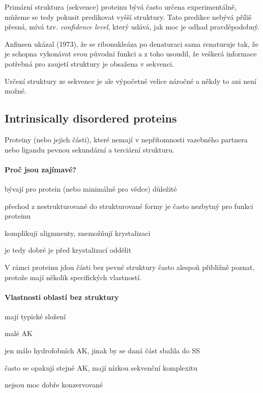 \documentclass[DIV=8]{scrreprt}
\begin{document}
Primární struktura (sekvence) proteinu bývá často určena experimentálně, můžeme se tedy pokusit predikovat vyšší struktury. Tato predikce nebývá příliš přesná, mívá tzv. \emph{confidence level}, který udává, jak moc je odhad pravděpodobný.

Anfinsen ukázal (1973), že se ribonukleáza po denaturaci sama renaturuje tak, že je schopna vykonávat svou původní funkci a z toho usoudil, že veškerá informace potřebná pro zaujetí struktury je obsažena v sekvenci.

Určení struktury ze sekvence je ale výpočetně velice náročné a někdy to ani není možné.

\subsection{Intrinsically disordered proteins} \label{Intrinsically disordered proteins}


Proteiny (nebo jejich části), které nemají v nepřítomnosti vazebného partnera nebo ligandu pevnou sekundární a terciární strukturu.

\paragraph{Proč jsou zajímavé?}
\begin{myItemize}[nosep]
    \item bývají pro protein (nebo minimálně pro vědce) důležité
    \item přechod z nestrukturované do strukturované formy je často nezbytný pro funkci proteinu
    \item komplikují alignmenty, znemožňují krystalizaci
\begin{myItemize}[nosep]
    \item je tedy dobré je před krystalizací oddělit
\end{myItemize}

\end{myItemize}



V rámci proteinu jdou části bez pevné struktury často alespoň přibližně poznat, protože mají několik specifických vlastností.

\paragraph{Vlastnosti oblastí bez struktury}
\begin{myItemize}[nosep]
    \item mají typické složení
\begin{myItemize}[nosep]
    \item malé AK
    \item jen málo hydrofobních AK, jinak by se daná část sbalila do SS
    \item často se opakují stejné AK, mají nízkou sekvenční komplexitu
\end{myItemize}

    \item nejsou moc dobře konzervované
\end{myItemize}
\end{document}
